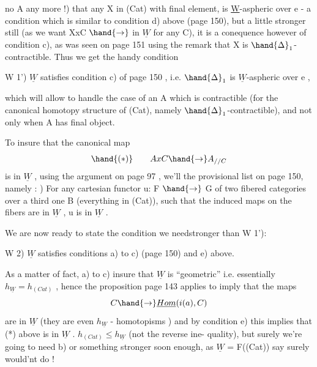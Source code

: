 
no A any more !)  that  any  X in (Cat) with final element, 
is \underline{W}-aspheric over e - a condition which is similar to  condition d)
above (page 150),  but a little stronger still (as we want XxC $\hand{\to}$  in $\underline{W}$
for any C),  it is a conequence however of condition c),  as was seen
on page 151  using the remark that X is $\hand{\Delta}_1$-contractible.  Thus we get
the handy condition

W 1')  $\underline{W}$  satisfies condition c) of page 150 ,  i.e. $\hand{\Delta}_1$ is $\underline{W}$-aspheric
over e ,

which will allow  to handle the case of an A which is contractible (for the
canonical homotopy structure of (Cat),  namely $\hand{\Delta}_1$-contractible),  and
not only when A has  final object.

  To insure that the canonical map
\[ \hand{(*)} \qquad AxC \hand{\to} A_{//C} \]
is in $\underline{W}$ , using the argument on page 97 , we'll  
the provisional list on page 150,  namely :
)  For any cartesian functor u: F $\hand{\to}$ G of two fibered categories over
a third one B (everything in (Cat)),  such that the induced maps
on the fibers are in $\underline{W}$ ,  u is in $\underline{W}$ .

We are now ready to state the condition we need\over{:}{(}stronger than W 1'):

W 2)  $\underline{W}$  satisfies conditions a) to c) (page 150) and e) above.

As a matter of fact,  a) to c) insure that $\underline{W}$ is ``geometric''  i.e.
essentially $h_{\underline{W}} = h_{(Cat)}$ ,  hence the proposition page 143 applies\hand{,} to 
imply that the maps
\[ C \hand{\to} \underline{Hom}(i(a),C) \]
are in $\underline{W}$  (they are even $h_{\underline{W}}$ - homotopisms ) and by condition e) this
implies that (*)  above is in $\underline{W}$ .   
   $h_{(Cat)} \leq h_{\underline{W}}$  (not the reverse ine-
quality),  but surely we're going to need b) or something stronger soon
enough,  as $\underline{W}$ = F((Cat)) say surely would'nt do !

